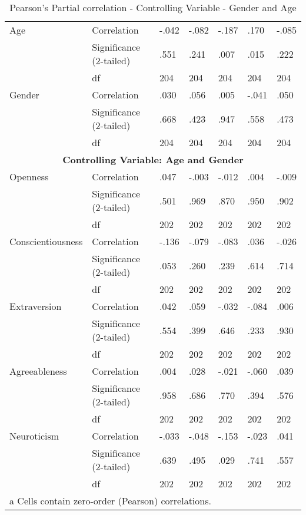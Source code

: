 \documentclass{llncs}
\begin{document}
\begin{table}[!ht]
\begin{tabular}{@{}lllllll@{}}
Age               & Correlation             & -.042 & -.082   & -.187 & .170  & -.085   \\
                  & Significance (2-tailed) & .551  & .241    & .007  & .015  & .222    \\
                  & df                      & 204   & 204     & 204   & 204   & 204     \\
Gender       & Correlation             & .030  & .056    & .005  & -.041 & .050    \\
                  & Significance (2-tailed) & .668  & .423    & .947  & .558  & .473    \\
                  & df                      & 204   & 204     & 204   & 204   & 204     \\
\multicolumn{7}{c}{\textbf{Controlling Variable: Age and Gender}}                       \\
Openness          & Correlation             & .047  & -.003   & -.012 & .004  & -.009   \\
                  & Significance (2-tailed) & .501  & .969    & .870  & .950  & .902    \\
                  & df                      & 202   & 202     & 202   & 202   & 202     \\
Conscientiousness & Correlation             & -.136 & -.079   & -.083 & .036  & -.026   \\
                  & Significance (2-tailed) & .053  & .260    & .239  & .614  & .714    \\
                  & df                      & 202   & 202     & 202   & 202   & 202     \\
Extraversion      & Correlation             & .042  & .059    & -.032 & -.084 & .006    \\
                  & Significance (2-tailed) & .554  & .399    & .646  & .233  & .930    \\
                  & df                      & 202   & 202     & 202   & 202   & 202     \\
Agreeableness     & Correlation             & .004  & .028    & -.021 & -.060 & .039    \\
                  & Significance (2-tailed) & .958  & .686    & .770  & .394  & .576    \\
                  & df                      & 202   & 202     & 202   & 202   & 202     \\
Neuroticism       & Correlation             & -.033 & -.048   & -.153 & -.023 & .041    \\
                  & Significance (2-tailed) & .639  & .495    & .029  & .741  & .557    \\
                  & df                      & 202   & 202     & 202   & 202   & 202     \\
\multicolumn{7}{l}{a Cells contain zero-order (Pearson) correlations.}                  \\ \bottomrule
\end{tabular}
\caption{Pearson's Partial correlation - Controlling Variable - Gender and Age }
\label{tbl: PearControllingGenderAge}
\end{table}
\end{document}
